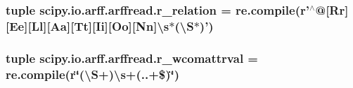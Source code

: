 \subsubsection[{r\+\_\+relation}]{\setlength{\rightskip}{0pt plus 5cm}tuple scipy.\+io.\+arff.\+arffread.\+r\+\_\+relation = re.\+compile({\bf r}'$^\wedge$@\mbox{[}Rr\mbox{]}\mbox{[}Ee\mbox{]}\mbox{[}Ll\mbox{]}\mbox{[}Aa\mbox{]}\mbox{[}Tt\mbox{]}\mbox{[}Ii\mbox{]}\mbox{[}Oo\mbox{]}\mbox{[}Nn\mbox{]}\textbackslash{}{\bf s}$\ast$(\textbackslash{}S$\ast$)')}\label{namespacescipy_1_1io_1_1arff_1_1arffread_aa7b8cb61c29f4f0212e873442bbc014f}
\hypertarget{namespacescipy_1_1io_1_1arff_1_1arffread_a604f79809deca66f2730b99697890039}{}
\subsubsection[{r\+\_\+wcomattrval}]{\setlength{\rightskip}{0pt plus 5cm}tuple scipy.\+io.\+arff.\+arffread.\+r\+\_\+wcomattrval = re.\+compile({\bf r}\char`\"{}(\textbackslash{}S+)\textbackslash{}{\bf s}+(..+\$)\char`\"{})}\label{namespacescipy_1_1io_1_1arff_1_1arffread_a604f79809deca66f2730b99697890039}
